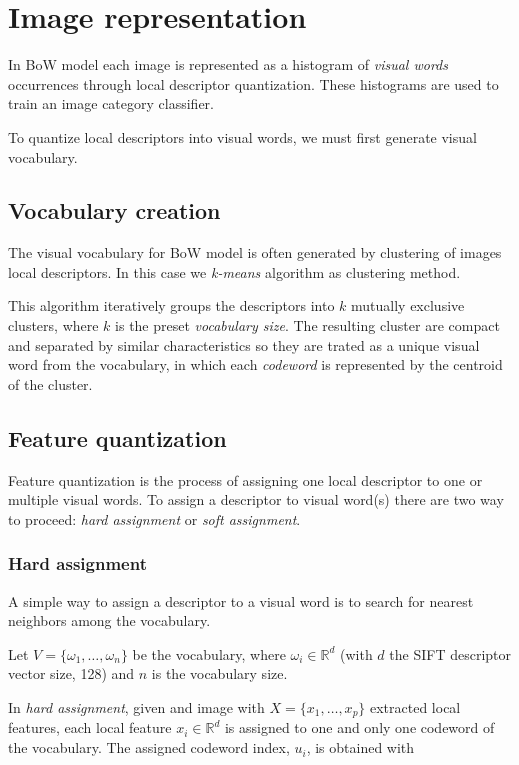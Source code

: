 \section{Image representation}

In BoW model each image is represented as a histogram of \emph{visual words} occurrences through local descriptor quantization\cite{DBLP:journals/corr/abs-1304-5168}. These histograms are used to train an image category classifier.

To quantize local descriptors into visual words, we must first generate visual vocabulary. 

\subsection{Vocabulary creation}

The visual vocabulary for BoW model is often generated by clustering of images local descriptors. In this case we \emph{k-means} algorithm as clustering method.

This algorithm iteratively groups the descriptors into $k$ mutually exclusive clusters, where $k$ is the preset \emph{vocabulary size}. The resulting cluster are compact and separated by similar characteristics so they are trated as a unique visual word from the vocabulary, in which each \emph{codeword} is represented by the centroid of the cluster.

\subsection{Feature quantization}

Feature quantization is the process of assigning one local descriptor to one or multiple
visual words. To assign a descriptor to visual word(s) there are two way to proceed: \emph{hard assignment} or \emph{soft assignment}.

\subsubsection{Hard assignment}

A simple way to assign a descriptor to a visual word is to search for nearest neighbors among the vocabulary.

Let $V = \{\omega_1, \ldots, \omega_n \}$ be the vocabulary, where $\omega_i \in \mathbb{R}^{d}$ (with $d$ the SIFT descriptor vector size, 128) and $n$ is the vocabulary size.

In \emph{hard assignment}, given and image with $X = \{x_1, \ldots, x_p\}$ extracted local features, each local feature $x_i \in \mathbb{R}^{d}$ is assigned to one and only one codeword of the vocabulary. The assigned codeword index, $u_i$, is obtained with

